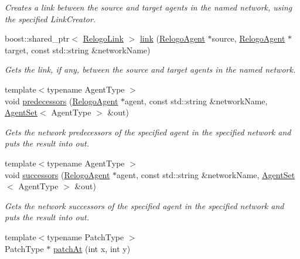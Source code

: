 \begin{DoxyCompactItemize}
\begin{DoxyCompactList}\small\item\em Creates a link between the source and target agents in the named network, using the specified Link\-Creator. \end{DoxyCompactList}\item 
boost\-::shared\-\_\-ptr$<$ \hyperlink{classrepast_1_1relogo_1_1_relogo_link}{Relogo\-Link} $>$ \hyperlink{classrepast_1_1relogo_1_1_observer_a26e12713f282594d49b31919de373f25}{link} (\hyperlink{classrepast_1_1relogo_1_1_relogo_agent}{Relogo\-Agent} $\ast$source, \hyperlink{classrepast_1_1relogo_1_1_relogo_agent}{Relogo\-Agent} $\ast$target, const std\-::string \&network\-Name)
\begin{DoxyCompactList}\small\item\em Gets the link, if any, between the source and target agents in the named network. \end{DoxyCompactList}\item 
{\footnotesize template$<$typename Agent\-Type $>$ }\\void \hyperlink{classrepast_1_1relogo_1_1_observer_a01f927604bdd537d650596604703d09c}{predecessors} (\hyperlink{classrepast_1_1relogo_1_1_relogo_agent}{Relogo\-Agent} $\ast$agent, const std\-::string \&network\-Name, \hyperlink{classrepast_1_1relogo_1_1_agent_set}{Agent\-Set}$<$ Agent\-Type $>$ \&out)
\begin{DoxyCompactList}\small\item\em Gets the network predecessors of the specified agent in the specified network and puts the result into out. \end{DoxyCompactList}\item 
{\footnotesize template$<$typename Agent\-Type $>$ }\\void \hyperlink{classrepast_1_1relogo_1_1_observer_a225bb07be2ba509b88746bff2e6d8745}{successors} (\hyperlink{classrepast_1_1relogo_1_1_relogo_agent}{Relogo\-Agent} $\ast$agent, const std\-::string \&network\-Name, \hyperlink{classrepast_1_1relogo_1_1_agent_set}{Agent\-Set}$<$ Agent\-Type $>$ \&out)
\begin{DoxyCompactList}\small\item\em Gets the network successors of the specified agent in the specified network and puts the result into out. \end{DoxyCompactList}\item 
{\footnotesize template$<$typename Patch\-Type $>$ }\\Patch\-Type $\ast$ \hyperlink{classrepast_1_1relogo_1_1_observer_a78c7ec8b81efadd6a3a1050ddf9043ce}{patch\-At} (int x, int y)

\end{DoxyCompactItemize}

